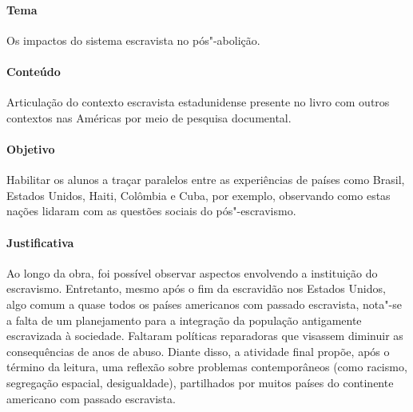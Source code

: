 \documentclass[12pt]{extarticle}
\begin{document}
 \paragraph{Tema} Os impactos do sistema escravista no pós"-abolição.

 \paragraph{Conteúdo} Articulação do contexto escravista estadunidense presente
 no livro com outros contextos nas Américas por meio de pesquisa documental.

 \paragraph{Objetivo} Habilitar os alunos a traçar paralelos entre as experiências
 de países como Brasil, Estados Unidos, Haiti, Colômbia e Cuba, por exemplo,
 observando como estas nações lidaram com as questões sociais do pós"-escravismo.

 \paragraph{Justificativa} Ao longo da obra, foi possível observar aspectos envolvendo
a instituição do escravismo. Entretanto, mesmo após o fim da escravidão
nos Estados Unidos, algo comum a quase todos os países americanos com
passado escravista, nota"-se a falta de um planejamento para a integração
da população antigamente escravizada à sociedade. Faltaram políticas
reparadoras que visassem diminuir as consequências de anos de abuso.
Diante disso, a atividade final propõe, após o término da leitura, uma
reflexão sobre problemas contemporâneos (como racismo, segregação
espacial, desigualdade), partilhados por muitos países do continente americano com
passado escravista. 
\end{document}
